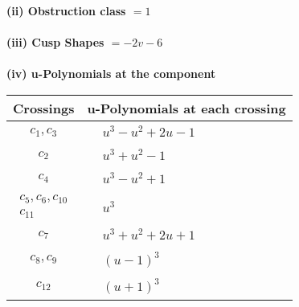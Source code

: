 \documentclass[1p]{elsarticle_modified}
\theoremstyle{definition}
\begin{document}
\flushleft \textbf{(ii) Obstruction class $= 1$}\\~\\
\flushleft \textbf{(iii) Cusp Shapes $= -2 v-6$}\\~\\
\newpage\renewcommand{\arraystretch}{1}
\flushleft \textbf{(iv) u-Polynomials at the component}\newline \\
\begin{tabular}{m{50pt}|m{274pt}}
Crossings & \hspace{64pt}u-Polynomials at each crossing \\
\hline $$\begin{aligned}c_{1},c_{3}\end{aligned}$$&$\begin{aligned}
&u^3- u^2+2 u-1
\end{aligned}$\\
\hline $$\begin{aligned}c_{2}\end{aligned}$$&$\begin{aligned}
&u^3+u^2-1
\end{aligned}$\\
\hline $$\begin{aligned}c_{4}\end{aligned}$$&$\begin{aligned}
&u^3- u^2+1
\end{aligned}$\\
\hline $$\begin{aligned}c_{5},c_{6},c_{10}\\c_{11}\end{aligned}$$&$\begin{aligned}
&u^3
\end{aligned}$\\
\hline $$\begin{aligned}c_{7}\end{aligned}$$&$\begin{aligned}
&u^3+u^2+2 u+1
\end{aligned}$\\
\hline $$\begin{aligned}c_{8},c_{9}\end{aligned}$$&$\begin{aligned}
&(u-1)^3
\end{aligned}$\\
\hline $$\begin{aligned}c_{12}\end{aligned}$$&$\begin{aligned}
&(u+1)^3
\end{aligned}$\\
\hline
\end{tabular}\\~\\
\end{document}
